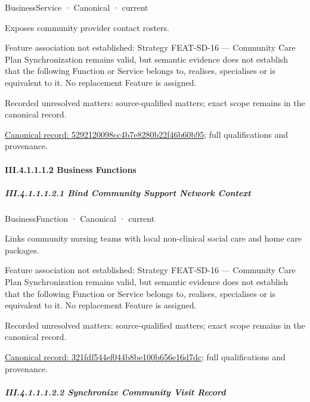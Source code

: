 \label{element:5292120098cc4b7e8280b22f46b60b95}
{\small BusinessService · Canonical · current}\par

Exposes community provider contact rosters.



Feature association not established: Strategy FEAT-SD-16 — Community Care Plan Synchronization remains valid, but semantic evidence does not establish that the following Function or Service belongs to, realises, specialises or is equivalent to it. No replacement Feature is assigned.


{\small Recorded unresolved matters: source-qualified matters; exact scope remains in the canonical record.}\par
{\footnotesize \href{../../../../../../../continuum/business/business-service/5292120098cc4b7e8280b22f46b60b95.md}{Canonical record: 5292120098cc4b7e8280b22f46b60b95}; full qualifications and provenance.}\par
\paragraph*{III.4.1.1.1.2 Business Functions}
\label{navigation:III.4.1.1.1.2}

\subparagraph*{III.4.1.1.1.2.1 Bind Community Support Network Context}
\label{navigation:III.4.1.1.1.2.1}

\label{element:321fdf544ef044b8be100b656e16d7dc}
{\small BusinessFunction · Canonical · current}\par

Links community nursing teams with local non-clinical social care and home care packages.



Feature association not established: Strategy FEAT-SD-16 — Community Care Plan Synchronization remains valid, but semantic evidence does not establish that the following Function or Service belongs to, realises, specialises or is equivalent to it. No replacement Feature is assigned.


{\small Recorded unresolved matters: source-qualified matters; exact scope remains in the canonical record.}\par
{\footnotesize \href{../../../../../../../continuum/business/business-function/321fdf544ef044b8be100b656e16d7dc.md}{Canonical record: 321fdf544ef044b8be100b656e16d7dc}; full qualifications and provenance.}\par
\subparagraph*{III.4.1.1.1.2.2 Synchronize Community Visit Record}
\label{navigation:III.4.1.1.1.2.2}

